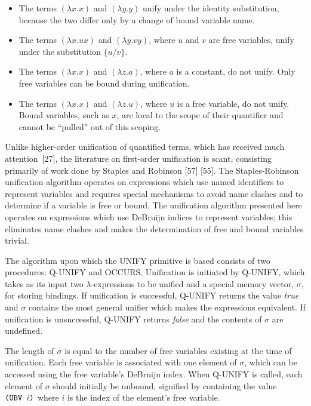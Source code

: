 \begin{itemize}
\item The terms \((\lambda x.x)\) and \((\lambda y.y)\) unify under the identity
substitution, because the two differ only by a change of bound variable name.
\item The terms \((\lambda x.ux)\) and \((\lambda y.vy)\), where \(u\) and \(v\)
are free variables, unify under the substitution \(\{u/v\}\).
\item The terms \((\lambda x.x)\) and \((\lambda z.a)\), where \(a\) is a
constant, do not unify. Only free variables can be bound during unification.
\item The terms \((\lambda x.x)\) and \((\lambda z.u)\), where \(u\) is a free
variable, do not unify. Bound variables, such as \(x\), are local to the scope
of their quantifier and cannot be ``pulled'' out of this scoping.
\end{itemize}

Unlike higher-order unification of quantified terms, which has received much
attention~[27], the literature on first-order unification is scant, consisting
primarily of work done by Staples and Robinson [57] [55]. The Staples-Robinson
unification algorithm operates on expressions which use named identifiers to
represent variables and requires special mechanisms to avoid name clashes and to
determine if a variable is free or bound. The unification algorithm presented
here operates on expressions which use DeBruijn indices to represent variables;
this eliminates name clashes and makes the determination of free and bound
variables trivial.

The algorithm upon which the UNIFY primitive is based consists of two
procedures: Q-UNIFY and OCCURS. Unification is initiated by Q-UNIFY, which takes
as its input two \(\lambda\)-expressions to be unified and a special memory
vector, \(\sigma\), for storing bindings. If unification is successful, Q-UNIFY
returns the value \emph{true} and \(\sigma\) contains the most general unifier which
makes the expressions equivalent. If unification is unsuccessful, Q-UNIFY
returns \emph{false} and the contents of \(\sigma\) are undefined.

The length of \(\sigma\) is equal to the number of free variables existing at
the time of unification. Each free variable is associated with one element of
\(\sigma\), which can be accessed using the free variable's DeBruijn index. When
Q-UNIFY is called, each element of \(\sigma\) should initially be unbound,
signified by containing the value \(\texttt{(UBV }i\texttt{)}\) where \(i\) is the index of
the element's free variable.

